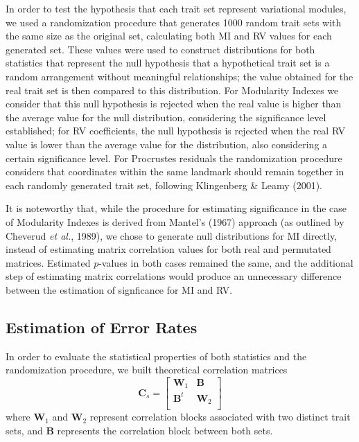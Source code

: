 \documentclass[12pt,]{article}
\begin{document}
In order to test the hypothesis that each trait set represent
variational modules, we used a randomization procedure that generates
1000 random trait sets with the same size as the original set,
calculating both MI and RV values for each generated set. These values
were used to construct distributions for both statistics that represent
the null hypothesis that a hypothetical trait set is a random
arrangement without meaningful relationships; the value obtained for the
real trait set is then compared to this distribution. For Modularity
Indexes we consider that this null hypothesis is rejected when the real
value is higher than the average value for the null distribution,
considering the significance level established; for RV coefficients, the
null hypothesis is rejected when the real RV value is lower than the
average value for the distribution, also considering a certain
significance level. For Procrustes residuals the randomization procedure
considers that coordinates within the same landmark should remain
together in each randomly generated trait set, following Klingenberg \&
Leamy (2001).

It is noteworthy that, while the procedure for estimating significance
in the case of Modularity Indexes is derived from Mantel's (1967)
approach (as outlined by Cheverud \emph{et al.}, 1989), we chose to
generate null distributions for MI directly, instead of estimating
matrix correlation values for both real and permutated matrices.
Estimated $p$-values in both cases remained the same, and the additional
step of estimating matrix correlations would produce an unnecessary
difference between the estimation of signficance for MI and RV.

\subsection{Estimation of Error Rates}\label{estimation-of-error-rates}

In order to evaluate the statistical properties of both statistics and
the randomization procedure, we built theoretical correlation matrices
\[
\mathbf{C}_{s} =
\begin{bmatrix}
\mathbf{W}_1 & \mathbf{B} \\
\mathbf{B}^t & \mathbf{W}_2 \\
\end{bmatrix}
\] where $\mathbf{W}_1$ and $\mathbf{W}_2$ represent correlation blocks
associated with two distinct trait sets, and $\mathbf{B}$ represents the
correlation block between both sets.
\end{document}
